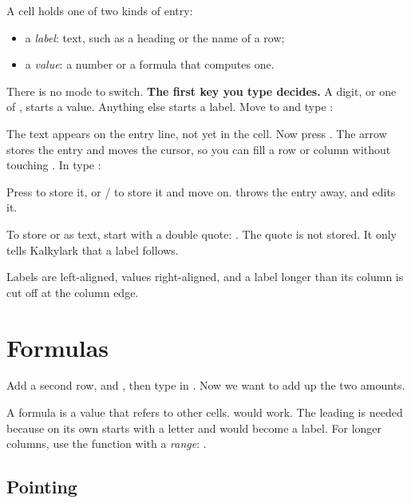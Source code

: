 \documentclass[11pt]{article}
\begin{document}
A cell holds one of two kinds of entry:

\begin{itemize}
\item a \emph{label}: text, such as a heading or the name of a row;
\item a \emph{value}: a number or a formula that computes one.
\end{itemize}

There is no mode to switch. \textbf{The first key you type decides.} A
digit, or one of , starts a value. Anything else starts a
label. Move to  and type :


The text appears on the entry line, not yet in the cell. Now press \rgt.
The arrow stores the entry and moves the cursor, so you can fill a row or
column without touching \enter. In  type :


Press \enter{} to store it, or \rgt/\down{} to store it and move on.
\esc{} throws the entry away, and  edits it.

\begin{note}
To store  or  as text, start with a double quote:
. The quote is not stored. It only tells Kalkylark that a label
follows.
\end{note}

Labels are left-aligned, values right-aligned, and a label longer than its
column is cut off at the column edge.

\section{Formulas}

Add a second row,  and , then type  in
. Now we want  to add up the two amounts.

A formula is a value that refers to other cells.  would work. The
leading \typ{+} is needed because  on its own starts with a letter
and would become a label. For longer columns, use the function 
with a \emph{range}: .

\subsection{Pointing}
\end{document}
